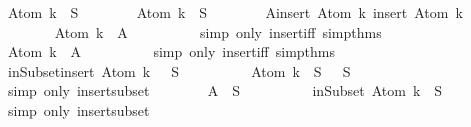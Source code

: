 \begin{isabellebody}
\ {\isachardoublequoteopen}Atom\ k\ {\isasymin}\ S{\isachardoublequoteclose}\isanewline
\ \ \ \ \ \ \isamarkupfalse%
\ {\isachardoublequoteopen}\isactrlbold {\isasymnot}{\isacharparenleft}Atom\ k{\isacharparenright}\ {\isasymin}\ S{\isachardoublequoteclose}\isanewline
\ \ \ \ \ \ \isamarkupfalse%
\ {\isacharquery}A{\isacharequal}{\isachardoublequoteopen}insert\ {\isacharparenleft}Atom\ k{\isacharparenright}\ {\isacharparenleft}insert\ {\isacharparenleft}\isactrlbold {\isasymnot}{\isacharparenleft}Atom\ k{\isacharparenright}{\isacharparenright}\ {\isacharbraceleft}{\isacharbraceright}{\isacharparenright}{\isachardoublequoteclose}\isanewline
\ \ \ \ \ \ \isamarkupfalse%
\ {\isachardoublequoteopen}Atom\ k\ {\isasymin}\ {\isacharquery}A{\isachardoublequoteclose}\isanewline
\ \ \ \ \ \ \ \ \isamarkupfalse%
\ {\isacharparenleft}simp\ only{\isacharcolon}\ insert{\isacharunderscore}iff\ simp{\isacharunderscore}thms{\isacharparenright}\ \isanewline
\ \ \ \ \ \ \isamarkupfalse%
\ {\isachardoublequoteopen}\isactrlbold {\isasymnot}{\isacharparenleft}Atom\ k{\isacharparenright}\ {\isasymin}\ {\isacharquery}A{\isachardoublequoteclose}\isanewline
\ \ \ \ \ \ \ \ \isamarkupfalse%
\ {\isacharparenleft}simp\ only{\isacharcolon}\ insert{\isacharunderscore}iff\ simp{\isacharunderscore}thms{\isacharparenright}\ \isanewline
\ \ \ \ \ \ \isamarkupfalse%
\ inSubset{\isacharcolon}{\isachardoublequoteopen}insert\ {\isacharparenleft}\isactrlbold {\isasymnot}{\isacharparenleft}Atom\ k{\isacharparenright}{\isacharparenright}\ {\isacharbraceleft}{\isacharbraceright}\ {\isasymsubseteq}\ S{\isachardoublequoteclose}\isanewline
\ \ \ \ \ \ \ \ \isamarkupfalse%
\ {\isacartoucheopen}\isactrlbold {\isasymnot}{\isacharparenleft}Atom\ k{\isacharparenright}\ {\isasymin}\ S{\isacartoucheclose}\ {\isacartoucheopen}{\isacharbraceleft}{\isacharbraceright}\ {\isasymsubseteq}\ S{\isacartoucheclose}\ \isamarkupfalse%
\ {\isacharparenleft}simp\ only{\isacharcolon}\ insert{\isacharunderscore}subset{\isacharparenright}\isanewline
\ \ \ \ \ \ \isamarkupfalse%
\ {\isachardoublequoteopen}{\isacharquery}A\ {\isasymsubseteq}\ S{\isachardoublequoteclose}\isanewline
\ \ \ \ \ \ \ \ \isamarkupfalse%
\ inSubset\ {\isacartoucheopen}Atom\ k\ {\isasymin}\ S{\isacartoucheclose}\ \isamarkupfalse%
\ {\isacharparenleft}simp\ only{\isacharcolon}\ insert{\isacharunderscore}subset{\isacharparenright}\isanewline
\ \ \ \ \ \ \isamarkupfalse%

\end{isabellebody}
